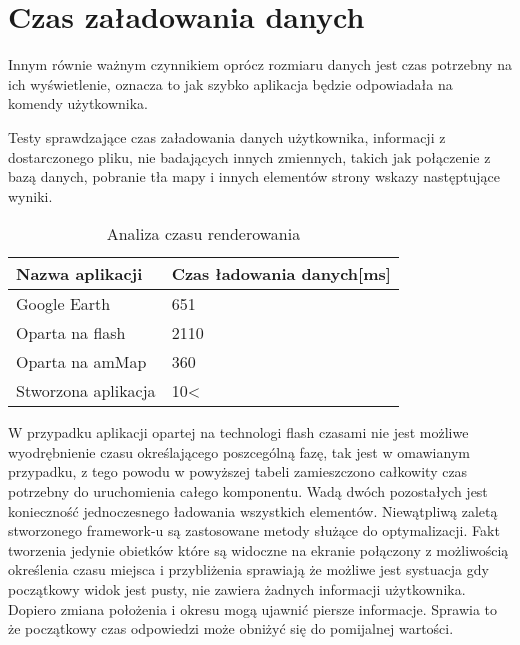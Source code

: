 \section{Czas załadowania danych}
\label{sec:datatime}

Innym równie ważnym czynnikiem oprócz rozmiaru danych jest czas potrzebny na ich wyświetlenie, oznacza to jak szybko aplikacja będzie odpowiadała na komendy użytkownika.

Testy sprawdzające czas załadowania danych użytkownika, informacji z dostarczonego pliku, nie badających innych zmiennych, takich jak połączenie z bazą danych, pobranie tła mapy i innych elementów strony wskazy następtujące wyniki.

\begin{table}[H]
    \centering
    \begin{tabular}{|l<{\raggedright}|p{3in}|}
    \hline
    Nazwa aplikacji & Czas ładowania danych[ms]  \\ \hline
    Google Earth  & 651 \\ \hline
    Oparta na flash  & 2110 \\ \hline
    Oparta na amMap  & 360 \\ \hline
    Stworzona aplikacja  & 10< \\ \hline
        \end{tabular}
    \caption{Analiza czasu renderowania}
    \label{tab:caseuse2}
\end{table}

W przypadku aplikacji opartej na technologi flash czasami nie jest możliwe wyodrębnienie czasu określającego poszcególną fazę, tak jest w omawianym przypadku, z tego powodu w powyższej tabeli zamieszczono całkowity czas potrzebny do uruchomienia całego komponentu.
Wadą dwóch pozostałych jest konieczność jednoczesnego ładowania wszystkich elementów.
Niewątpliwą zaletą stworzonego framework-u są zastosowane metody służące do optymalizacji. Fakt tworzenia jedynie obietków które są widoczne na ekranie połączony z możliwością określenia czasu miejsca i przybliżenia sprawiają że możliwe jest systuacja gdy początkowy widok jest pusty, nie zawiera żadnych informacji użytkownika. Dopiero zmiana położenia i okresu mogą ujawnić piersze informacje. Sprawia to że początkowy czas odpowiedzi może obniżyć się do pomijalnej wartości.


